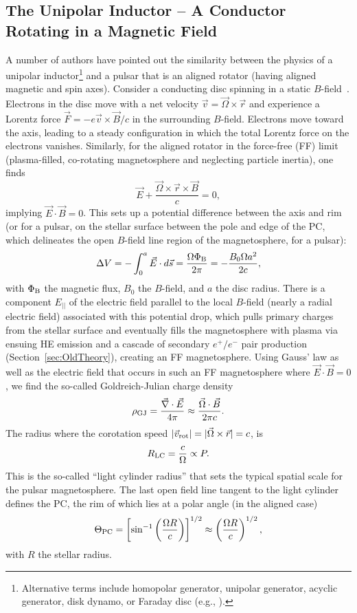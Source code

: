 \documentclass{PoS}
\newcommand{\beq}{\begin{equation}}
\newcommand{\eeq}{\end{equation}}
\begin{document}
\subsection{The Unipolar Inductor -- A Conductor Rotating in a Magnetic Field}
A number of authors have pointed out the similarity between the physics of a unipolar inductor\footnote{Alternative terms include homopolar generator,  unipolar generator, acyclic generator, disk dynamo, or Faraday disc (e.g., \cite{Valone01}).} and a pulsar that is an aligned rotator (having aligned magnetic and spin axes). Consider a conducting disc spinning in a static $B$-field~\cite{Montgomery99}. Electrons in the disc move with a net velocity $\vec{v}=\vec{\Omega}\times\vec{r}$ and experience a Lorentz force $\vec{F}=-e\vec{v}\times\vec{B}/c$ in the surrounding $B$-field. Electrons move toward the axis, leading to a steady configuration in which the total Lorentz force on the electrons vanishes. Similarly, for the aligned rotator in the force-free (FF) limit (plasma-filled, co-rotating magnetosphere and neglecting particle inertia), one finds~\cite{GJ69} 
\beq
\vec{E} + \frac{\vec{\Omega}\times\vec{r}\times\vec{B}}{c} = 0,
\eeq
implying $\vec{E}\cdot\vec{B} = 0$. 
This sets up a potential difference between the axis and rim (or for a pulsar, on the stellar surface between the pole and edge of the PC, which delineates the open $B$-field line region of the magnetosphere, for a pulsar):
\beq
\Delta V = -\int_0^a\vec{E}\cdot d\vec{s} = \frac{\Omega\Phi_{\rm B}}{2\pi} = -\frac{B_0\Omega a^2}{2c},\label{eq:Vdrop}
\eeq
with $\Phi_{\rm B}$ the magnetic flux, $B_0$ the $B$-field, and $a$ the disc radius. There is a component $E_{||}$ of the electric field parallel to the local $B$-field (nearly a radial electric field) associated with this potential drop, which pulls primary charges from the stellar surface and eventually fills the magnetosphere with plasma via ensuing HE emission and a cascade of secondary $e^+/e^{-}$ pair production (Section~\ref{sec:OldTheory}), creating an FF magnetosphere. Using Gauss' law as well as the electric field that occurs in such an FF magnetosphere where $\vec{E}\cdot\vec{B} = 0$, we find the so-called Goldreich-Julian charge density~\cite{GJ69}
\beq
\rho_{\rm GJ}= \frac{\vec{\nabla}\cdot\vec{E}}{4\pi}\approx\frac{\vec{\Omega}\cdot\vec{B}}{2\pi c}.\label{eq:rhoGJ}
\eeq
The radius where the corotation speed $|\vec{v}_{\rm rot}|=|\vec{\Omega}\times\vec{r}|=c$, is
\beq
R_{\rm LC} = \frac{c}{\Omega}\propto P.
\eeq
This is the so-called ``light cylinder radius'' that sets the typical spatial scale for the pulsar magnetosphere. The last open field line tangent to the light cylinder defines the PC, the rim of which lies at a polar angle (in the aligned case)
\beq
\Theta_{\rm PC} = \left[\sin^{-1}\left(\frac{\Omega R}{c}\right)\right]^{1/2}\approx\left(\frac{\Omega R}{c}\right)^{1/2},
\eeq
with $R$ the stellar radius.
\end{document}
